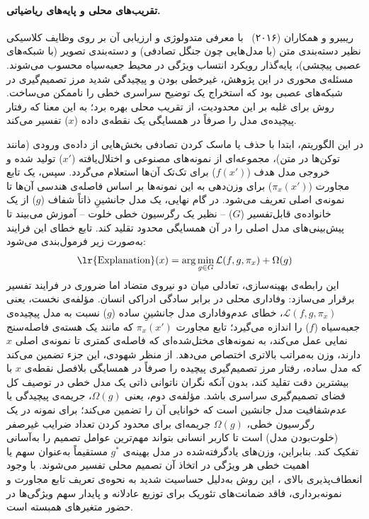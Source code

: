 \paragraph{تقریب‌های محلی و پایه‌های ریاضیاتی.}

\normalfootnotes{}
ریبیرو و همکاران (۲۰۱۶)~\cite{ribeiro2016lime} با معرفی متدولوژی  و ارزیابی آن بر روی وظایف کلاسیکی نظیر دسته‌بندی متن (با مدل‌هایی چون جنگل تصادفی) و دسته‌بندی تصویر (با شبکه‌های عصبی پیچشی)، پایه‌گذار رویکرد انتساب ویژگی در محیط جعبه‌سیاه محسوب می‌شوند. مسئله‌ی محوری در این پژوهش، غیرخطی بودن و پیچیدگی شدید مرز تصمیم‌گیری در شبکه‌های عصبی بود که استخراج یک توضیح سراسری خطی را ناممکن می‌ساخت. روش  برای غلبه بر این محدودیت، از تقریب محلی بهره برد؛ به این معنا که رفتار پیچیده‌ی مدل را صرفاً در همسایگی یک نقطه‌ی داده ($x$) تفسیر می‌کند.
\twocolumnfootnotes{}

در این الگوریتم، ابتدا با حذف یا ماسک کردن تصادفی بخش‌هایی از داده‌ی ورودی (مانند توکن‌ها در متن)، مجموعه‌ای از نمونه‌های مصنوعی و اختلال‌یافته ($x'$) تولید شده و خروجی مدل هدف ($f(x')$) برای تک‌تک آن‌ها استعلام می‌گردد. سپس، یک تابع مجاورت ($\pi_x(x')$) برای وزن‌دهی به این نمونه‌ها بر اساس فاصله‌ی هندسی آن‌ها تا نمونه‌ی اصلی تعریف می‌شود. در گام نهایی، یک مدل جانشینِ ذاتاً شفاف ($g$) از یک خانواده‌ی قابل‌تفسیر ($G$) – نظیر یک رگرسیون خطی خلوت – آموزش می‌بیند تا پیش‌بینی‌های مدل اصلی را در آن همسایگی محدود تقلید کند. تابع خطای این فرایند به‌صورت زیر فرمول‌بندی می‌شود:
\begin{equation}\label{eq:chap3_lime}
    \text{\lr{Explanation}}(x) = \arg\min_{g \in G} \mathcal{L}(f, g, \pi_x) + \Omega(g)
\end{equation}
این رابطه‌ی بهینه‌سازی، تعادلی میان دو نیروی متضاد اما ضروری در فرایند تفسیر برقرار می‌سازد: وفاداری محلی در برابر سادگی ادراکی انسان.
مؤلفه‌ی نخست، یعنی $\mathcal{L}(f, g, \pi_x)$، خطای عدم‌وفاداری مدل جانشینِ ساده ($g$) نسبت به مدل پیچیده‌ی جعبه‌سیاه ($f$) را اندازه می‌گیرد؛ تابع مجاورت $\pi_x(x')$ که مانند یک هسته‌ی فاصله‌سنج نمایی عمل می‌کند، به نمونه‌های مختل‌شده‌ای که فاصله‌ی کمتری تا نمونه‌ی اصلی $x$ دارند، وزن به‌مراتب بالاتری اختصاص می‌دهد. از منظر شهودی، این جزء تضمین می‌کند که مدل ساده، رفتار مرز تصمیم‌گیری پیچیده را صرفاً در همسایگی بلافصل نقطه‌ی $x$ با بیشترین دقت تقلید کند، بدون آنکه نگران ناتوانی ذاتی یک مدل خطی در توصیف کل فضای تصمیم‌گیری سراسری باشد.
مؤلفه‌ی دوم، یعنی $\Omega(g)$، جریمه‌ی پیچیدگی یا عدم‌شفافیت مدل جانشین است که خوانایی آن را تضمین می‌کند؛ برای نمونه در یک رگرسیون خطی، $\Omega(g)$ جریمه‌ای برای محدود کردن تعداد ضرایب غیرصفر (خلوت‌بودن مدل) است تا کاربر انسانی بتواند مهم‌ترین عوامل تصمیم را به‌آسانی تفکیک کند. بنابراین، وزن‌های یادگرفته‌شده در مدل بهینه‌ی $g^*$ مستقیماً به‌عنوان سهم یا اهمیت خطی هر ویژگی در اتخاذ آن تصمیم محلی تفسیر می‌شوند. با وجود انعطاف‌پذیری بالای ، این روش به‌دلیل حساسیت شدید به نحوه‌ی تعریف تابع مجاورت و نمونه‌برداری، فاقد ضمانت‌های تئوریک برای توزیع عادلانه و پایدار سهم ویژگی‌ها در حضور متغیرهای همبسته است.


